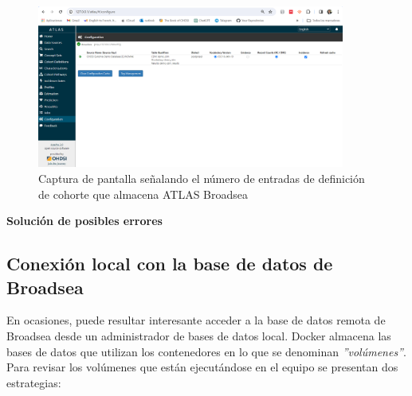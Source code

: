 \documentclass{article}
\begin{document}
\begin{enumerate}
\begin{figure}[H]
    \centering
    \includegraphics[width=0.90\textwidth]{images/atlasBroadseaDB.png}
     \caption{Captura de pantalla señalando el número de entradas de definición de cohorte que almacena ATLAS Broadsea}
    \label{fig:atlasBroadseaDB}
\end{figure}
    
\end{enumerate}

\textbf{Solución de posibles errores}

\subsection{Conexión local con la base de datos de Broadsea}

En ocasiones, puede resultar interesante acceder a la base de datos remota de Broadsea desde un administrador de bases de datos local.  Docker almacena las bases de datos que utilizan los contenedores en lo que se denominan \textit{''volúmenes''}. Para revisar los volúmenes que están ejecutándose en el equipo se presentan dos estrategias:
\end{document}
